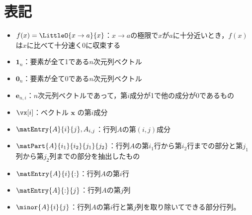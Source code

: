 \chapter{表記}
    \begin{itemize}
        \item $f(x) = \LittleO{x\to a}{x}$：$x\to a$の極限で$x$が$a$に十分近いとき，$f(x)$は$x$に比べて十分速く0に収束する
        \item $\bm{1}_n$：要素が全て1である$n$次元列ベクトル
        \item $\bm{0}_n$：要素が全て0である$n$次元列ベクトル
        \item $\bm{e}_{n,i}$：$n$次元列ベクトルであって，第$i$成分が1で他の成分が0であるもの
        \item $\vx[i]$：ベクトル $\bm{x}$ の第$i$成分
        \item $\matEntry{A}{i}{j},A_{i,j}$：行列$A$の第$(i,j)$成分
        \item $\matPart{A}{i_1}{i_2}{j_1}{j_2}$：行列$A$の第$i_1$行から第$i_2$行までの部分と第$j_1$列から第$j_2$列までの部分を抽出したもの
        \item $\matEntry{A}{i}{:}$：行列$A$の第$i$行
        \item $\matEntry{A}{:}{j}$：行列$A$の第$j$列
        \item $\minor{A}{i}{j}$：行列$A$の第$i$行と第$j$列を取り除いてできる部分行列。
    \end{itemize}